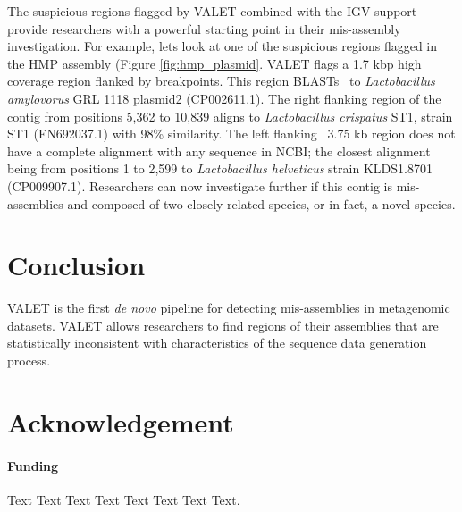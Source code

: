 \documentclass{bioinfo}
\begin{document}
The suspicious regions flagged by VALET combined with the IGV support provide researchers with a powerful starting point in their mis-assembly investigation.
For example, lets look at one of the suspicious regions flagged in the HMP assembly (Figure \ref{fig:hmp_plasmid}.
VALET flags a 1.7 kbp high coverage region flanked by breakpoints.
This region BLASTs~\citep{BLAST} to \emph{Lactobacillus amylovorus} GRL 1118 plasmid2 (CP002611.1).
The right flanking region of the contig from positions 5,362 to 10,839 aligns to \emph{Lactobacillus crispatus} ST1, strain ST1 (FN692037.1) with 98\% similarity.
The left flanking ~3.75 kb region does not have a complete alignment with any sequence in NCBI; the closest alignment being from positions 1 to 2,599 to \emph{Lactobacillus helveticus} strain KLDS1.8701 (CP009907.1).
Researchers can now investigate further if this contig is mis-assemblies and composed of two closely-related species, or in fact, a novel species.

\section{Conclusion}

VALET is the first \emph{de novo} pipeline for detecting mis-assemblies in metagenomic datasets.
VALET allows researchers to find regions of their assemblies that are statistically inconsistent with characteristics of the sequence data generation process.


\section*{Acknowledgement}

\paragraph{Funding\textcolon} Text Text Text Text Text Text  Text Text.


% 
% 
% 
% 




\end{document}
